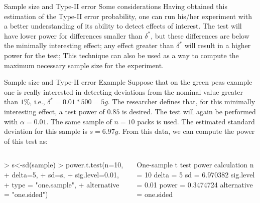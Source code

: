 \documentclass[t]{beamer}
\begin{document}

\begin{ftst}
{Sample size and Type-II error}
{Some considerations}
Having obtained this estimation of the Type-II error probability, one can run his/her experiment with a better understanding of its ability to detect effects of interest.
\vone
The test will have lower power for differences smaller than $\delta^*$, but these differences are below the minimally interesting effect; any effect greater than $\delta^*$ will result in a higher power for the test;
\vone
This technique can also be used as a way to compute the maximum necessary sample size for the experiment.
\end{ftst}


\begin{ftstf}
{Sample size and Type-II error}
{Example}
Suppose that on the green peas example one is really interested in detecting deviations from the nominal value greater than $1\%$, i.e., $\delta^* = 0.01*500 = 5g$. The researcher defines that, for this minimally interesting effect, a test power of $0.85$ is desired. The test will again be performed with $\alpha = 0.01$.
\vone
The same sample of $n=10$ packs is used. The estimated standard deviation for this sample is $s=6.97g$. From this data, we can compute the power of this test as:
\begin{columns}
\begin{rcode}
> s<-sd(sample)
> power.t.test(n=10, 
+        delta=5, 
+        sd=s, 
+        sig.level=0.01, 
+        type = "one.sample", 
+        alternative = "one.sided")
\end{rcode}
\begin{rcode}
One-sample t test power calculation 
n = 10
delta = 5
sd = 6.970382
sig.level = 0.01
power = 0.3474724
alternative = one.sided
\end{rcode}
\end{columns}
\end{ftstf}
\end{document}
